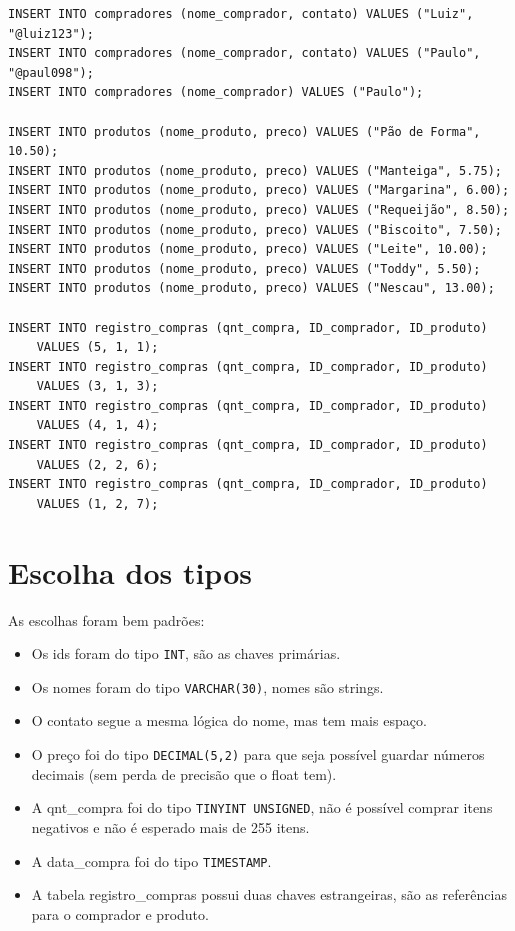 \documentclass{article}
\begin{document}
\begin{verbatim}
INSERT INTO compradores (nome_comprador, contato) VALUES ("Luiz", "@luiz123");
INSERT INTO compradores (nome_comprador, contato) VALUES ("Paulo", "@paul098");
INSERT INTO compradores (nome_comprador) VALUES ("Paulo");

INSERT INTO produtos (nome_produto, preco) VALUES ("Pão de Forma", 10.50);
INSERT INTO produtos (nome_produto, preco) VALUES ("Manteiga", 5.75);
INSERT INTO produtos (nome_produto, preco) VALUES ("Margarina", 6.00);
INSERT INTO produtos (nome_produto, preco) VALUES ("Requeijão", 8.50);
INSERT INTO produtos (nome_produto, preco) VALUES ("Biscoito", 7.50);
INSERT INTO produtos (nome_produto, preco) VALUES ("Leite", 10.00);
INSERT INTO produtos (nome_produto, preco) VALUES ("Toddy", 5.50);
INSERT INTO produtos (nome_produto, preco) VALUES ("Nescau", 13.00);

INSERT INTO registro_compras (qnt_compra, ID_comprador, ID_produto)
    VALUES (5, 1, 1);
INSERT INTO registro_compras (qnt_compra, ID_comprador, ID_produto)
    VALUES (3, 1, 3);
INSERT INTO registro_compras (qnt_compra, ID_comprador, ID_produto)
    VALUES (4, 1, 4);
INSERT INTO registro_compras (qnt_compra, ID_comprador, ID_produto)
    VALUES (2, 2, 6);
INSERT INTO registro_compras (qnt_compra, ID_comprador, ID_produto)
    VALUES (1, 2, 7);
\end{verbatim}

\newpage
\section*{Escolha dos tipos}

As escolhas foram bem padrões:
\begin{itemize}
    \item
        Os ids foram do tipo \texttt{INT}, são as chaves primárias.
    \item
        Os nomes foram do tipo \texttt{VARCHAR(30)}, nomes são strings.
    \item
        O contato segue a mesma lógica do nome, mas tem mais espaço.
    \item
        O preço foi do tipo \texttt{DECIMAL(5,2)} para que seja possível guardar números decimais (sem perda de precisão que o float tem).
    \item
        A qnt\_compra foi do tipo \texttt{TINYINT UNSIGNED}, não é possível comprar itens negativos e não é esperado mais de 255 itens.
    \item
        A data\_compra foi do tipo \texttt{TIMESTAMP}.
    \item
        A tabela registro\_compras possui duas chaves estrangeiras, são as referências para o comprador e produto.
\end{itemize}
\end{document}

